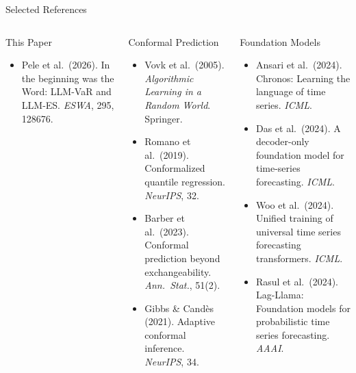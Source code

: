 \documentclass[9pt, aspectratio=169, t]{beamer}
\begin{document}
\begin{frame}{Selected References}
	\vspace{-0.3cm}
	{\tiny
	\begin{columns}[T]
		\begin{block}{This Paper}
		\begin{itemize}\setlength{\itemsep}{0pt}
			\item Pele et al.\ (2026). In the beginning was the Word: LLM-VaR and LLM-ES. \textit{ESWA}, 295, 128676.
		\end{itemize}
		\end{block}

		\begin{block}{Conformal Prediction}
		\begin{itemize}\setlength{\itemsep}{0pt}
			\item Vovk et al.\ (2005). \textit{Algorithmic Learning in a Random World}. Springer.
			\item Romano et al.\ (2019). Conformalized quantile regression. \textit{NeurIPS}, 32.
			\item Barber et al.\ (2023). Conformal prediction beyond exchangeability. \textit{Ann.\ Stat.}, 51(2).
			\item Gibbs \& Cand\`es (2021). Adaptive conformal inference. \textit{NeurIPS}, 34.
		\end{itemize}
		\end{block}

		\begin{block}{Foundation Models}
		\begin{itemize}\setlength{\itemsep}{0pt}
			\item Ansari et al.\ (2024). Chronos: Learning the language of time series. \textit{ICML}.
			\item Das et al.\ (2024). A decoder-only foundation model for time-series forecasting. \textit{ICML}.
			\item Woo et al.\ (2024). Unified training of universal time series forecasting transformers. \textit{ICML}.
			\item Rasul et al.\ (2024). Lag-Llama: Foundation models for probabilistic time series forecasting. \textit{AAAI}.
		\end{itemize}
		\end{block}
	\end{columns}
	}
\end{frame}
\end{document}
